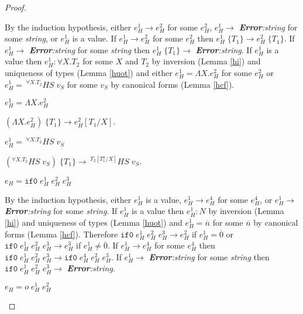 \begin{hps}
\begin{proof}
\begin{hps-case-8}
By the induction hypothesis, either $e_{H}^{1}\rightarrow e_{H}^{2}$ for some $e_{H}^{2}$, $e_{H}^{1}\rightarrow$ \emph{\textbf{Error}:\;string} for some \emph{string}, or $e_{H}^{1}$ is a value.  If $e_{H}^{1}\rightarrow e_{H}^{2}$ for some $e_{H}^{2}$ then $e_{H}^{1}\;\lbrace T_{1}\rbrace\rightarrow e_{H}^{2}\;\lbrace T_{1}\rbrace$.  If $e_{H}^{1}\rightarrow$ \emph{\textbf{Error}:\;string} for some \emph{string} then $e_{H}^{1}\;\lbrace T_{1}\rbrace\rightarrow$ \emph{\textbf{Error}:\;string}.  If $e_{H}^{1}$ is a value then $e_{H}^{1}:\forall X.T_{2}$ for some $X$ and $T_{2}$ by inversion (Lemma \ref{hi}) and uniqueness of types (Lemma \ref{huot}) and either $e_{H}^{1}=\Lambda X.e_{H}^{2}$ for some $e_{H}^{2}$ or $e_{H}^{1}=\,^{\forall X.T_{2}}HS\;v_{S}$ for some $v_{S}$ by canonical forms (Lemma \ref{hcf}).
\end{hps-case-8}
\begin{hps-case-8-1}
$e_{H}^{1}=\Lambda X.e_{H}^{2}$

$(\Lambda X.e_{H}^{2})\;\lbrace T_{1}\rbrace\rightarrow e_{H}^{2}[T_{1}/X]$.
\end{hps-case-8-1}
\begin{hps-case-8-2}
$e_{H}^{1}=\,^{\forall X.T_{2}}HS\;v_{S}$

$(^{\forall X.T_{2}}HS\;v_{S})\;\lbrace T_{1}\rbrace\rightarrow\,^{T_{2}[T_{1}^{a}/X]}HS\;v_{S}$.
\end{hps-case-8-2}
\begin{hps-case-9}
$e_{H}=\mathtt{if0}\;e_{H}^{1}\;e_{H}^{2}\;e_{H}^{3}$

By the induction hypothesis, either $e_{H}^{1}$ is a value, $e_{H}^{1}\rightarrow e_{H}^{4}$ for some $e_{H}^{4}$, or $e_{H}^{1}\rightarrow$ \emph{\textbf{Error}:\;string} for some \emph{string}.  If $e_{H}^{1}$ is a value then $e_{H}^{1}:N$ by inversion (Lemma \ref{hi}) and uniqueness of types (Lemma \ref{huot}) and $e_{H}^{1}=\overline{n}$ for some $\overline{n}$ by canonical forms (Lemma \ref{hcf}).  Therefore $\mathtt{if0}\;e_{H}^{1}\;e_{H}^{2}\;e_{H}^{3}\rightarrow e_{H}^{2}$ if $e_{H}^{1}=\overline{0}$ or $\mathtt{if0}\;e_{H}^{1}\;e_{H}^{2}\;e_{H}^{3}\rightarrow e_{H}^{3}$ if $e_{H}^{1}\neq\overline{0}$.  If $e_{H}^{1}\rightarrow e_{H}^{4}$ for some $e_{H}^{4}$ then $\mathtt{if0}\;e_{H}^{1}\;e_{H}^{2}\;e_{H}^{3}\rightarrow \mathtt{if0}\;e_{H}^{4}\;e_{H}^{2}\;e_{H}^{3}$.  If $e_{H}^{1}\rightarrow$ \emph{\textbf{Error}:\;string} for some \emph{string} then $\mathtt{if0}\;e_{H}^{1}\;e_{H}^{2}\;e_{H}^{3}\rightarrow$ \emph{\textbf{Error}:\;string}.
\end{hps-case-9}
\begin{hps-case-10}
$e_{H}=o\;e_{H}^{1}\;e_{H}^{2}$


\end{hps-case-10}
\end{proof}
\end{hps}
